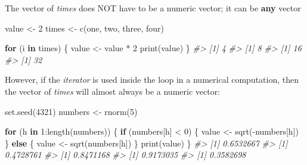 \documentclass[
]{book}
\newenvironment{Shaded}{\begin{snugshade}}{\end{snugshade}}
\newcommand{\CommentTok}[1]{\textcolor[rgb]{0.56,0.35,0.01}{\textit{#1}}}
\newcommand{\ControlFlowTok}[1]{\textcolor[rgb]{0.13,0.29,0.53}{\textbf{#1}}}
\newcommand{\DecValTok}[1]{\textcolor[rgb]{0.00,0.00,0.81}{#1}}
\newcommand{\FunctionTok}[1]{\textcolor[rgb]{0.00,0.00,0.00}{#1}}
\newcommand{\NormalTok}[1]{#1}
\newcommand{\OtherTok}[1]{\textcolor[rgb]{0.56,0.35,0.01}{#1}}
\newcommand{\SpecialCharTok}[1]{\textcolor[rgb]{0.00,0.00,0.00}{#1}}
\newcommand{\StringTok}[1]{\textcolor[rgb]{0.31,0.60,0.02}{#1}}
\begin{document}
The vector of \emph{times} does NOT have to be a numeric vector; it can be \textbf{any}
vector

\begin{Shaded}
\begin{Highlighting}[]
\NormalTok{value }\OtherTok{\textless{}{-}} \DecValTok{2}
\NormalTok{times }\OtherTok{\textless{}{-}} \FunctionTok{c}\NormalTok{(}\StringTok{\textquotesingle{}one\textquotesingle{}}\NormalTok{, }\StringTok{\textquotesingle{}two\textquotesingle{}}\NormalTok{, }\StringTok{\textquotesingle{}three\textquotesingle{}}\NormalTok{, }\StringTok{\textquotesingle{}four\textquotesingle{}}\NormalTok{)}

\ControlFlowTok{for}\NormalTok{ (i }\ControlFlowTok{in}\NormalTok{ times) \{ }
\NormalTok{  value }\OtherTok{\textless{}{-}}\NormalTok{ value }\SpecialCharTok{*} \DecValTok{2} 
  \FunctionTok{print}\NormalTok{(value)}
\NormalTok{\}}
\CommentTok{\#\textgreater{} [1] 4}
\CommentTok{\#\textgreater{} [1] 8}
\CommentTok{\#\textgreater{} [1] 16}
\CommentTok{\#\textgreater{} [1] 32}
\end{Highlighting}
\end{Shaded}

However, if the \emph{iterator} is used inside the loop in a numerical computation,
then the vector of \emph{times} will almost always be a numeric vector:

\begin{Shaded}
\begin{Highlighting}[]
\FunctionTok{set.seed}\NormalTok{(}\DecValTok{4321}\NormalTok{)}
\NormalTok{numbers }\OtherTok{\textless{}{-}} \FunctionTok{rnorm}\NormalTok{(}\DecValTok{5}\NormalTok{)}

\ControlFlowTok{for}\NormalTok{ (h }\ControlFlowTok{in} \DecValTok{1}\SpecialCharTok{:}\FunctionTok{length}\NormalTok{(numbers)) \{}
  \ControlFlowTok{if}\NormalTok{ (numbers[h] }\SpecialCharTok{\textless{}} \DecValTok{0}\NormalTok{) \{}
\NormalTok{    value }\OtherTok{\textless{}{-}} \FunctionTok{sqrt}\NormalTok{(}\SpecialCharTok{{-}}\NormalTok{numbers[h])}
\NormalTok{  \} }\ControlFlowTok{else}\NormalTok{ \{}
\NormalTok{    value }\OtherTok{\textless{}{-}} \FunctionTok{sqrt}\NormalTok{(numbers[h])}
\NormalTok{  \}}
  \FunctionTok{print}\NormalTok{(value)}
\NormalTok{\}}
\CommentTok{\#\textgreater{} [1] 0.6532667}
\CommentTok{\#\textgreater{} [1] 0.4728761}
\CommentTok{\#\textgreater{} [1] 0.8471168}
\CommentTok{\#\textgreater{} [1] 0.9173035}
\CommentTok{\#\textgreater{} [1] 0.3582698}
\end{Highlighting}
\end{Shaded}
\end{document}

